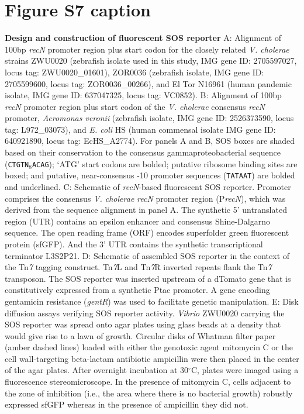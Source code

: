 \documentclass[12pt]{article}
\begin{document}
\section*{Figure S7 caption}
\textbf{Design and construction of fluorescent SOS reporter} A: Alignment of 100bp \textit{recN} promoter region plus start codon for the closely related \textit{V. cholerae} strains ZWU0020 (zebrafish isolate used in this study, IMG gene ID: 2705597027, locus tag: ZWU0020\_01601), ZOR0036 (zebrafish isolate, IMG gene ID: 2705599600, locus tag: ZOR0036\_00266), and El Tor N16961 (human pandemic isolate, IMG gene ID: 637047325, locus tag: VC0852). B: Alignment of 100bp \textit{recN} promoter region plus start codon of the \textit{V. cholerae} consensus \textit{recN} promoter, \textit{Aeromonas veronii} (zebrafish isolate, IMG gene ID: 2526373590, locus tag: L972\_03073), and \textit{E. coli} HS (human commensal isolate IMG gene ID: 640921890, locus tag: EcHS\_A2774). For panels A and B, SOS boxes are shaded based on their conservation to the consensus gammaproteobacterial sequence (\texttt{CTGTN$_8$ACAG}); `ATG' start codons are bolded; putative ribosome binding sites are boxed; and putative, near-consensus -10 promoter sequences (\texttt{TATAAT}) are bolded and underlined. C: Schematic of \textit{recN}-based fluorescent SOS reporter. Promoter comprises the consensus \textit{V. cholerae} \textit{recN} promoter region (P\textit{recN}), which was derived from the sequence alignment in panel A. The synthetic 5' untranslated region (UTR) contains an epsilon enhancer and consensus Shine-Dalgarno sequence. The open reading frame (ORF) encodes superfolder green fluorescent protein (sfGFP). And the 3' UTR contains the synthetic transcriptional terminator L3S2P21. D: Schematic of assembled SOS reporter in the context of the Tn\textit{7} tagging construct. Tn\textit{7}L and Tn\textit{7}R inverted repeats flank the Tn\textit{7} transposon. The SOS reporter was inserted upstream of a dTomato gene that is constitutively expressed from a synthetic Ptac promoter. A gene encoding gentamicin resistance (\textit{gentR}) was used to facilitate genetic manipulation. E: Disk diffusion assays verifying SOS reporter activity. \textit{Vibrio} ZWU0020 carrying the SOS reporter was spread onto agar plates using glass beads at a density that would give rise to a lawn of growth. Circular disks of Whatman filter paper (amber dashed lines) loaded with either the genotoxic agent mitomycin C or the cell wall-targeting beta-lactam antibiotic ampicillin were then placed in the center of the agar plates. After overnight incubation at 30$^{\circ}$C, plates were imaged using a fluorescence stereomicroscope. In the presence of mitomycin C, cells adjacent to the zone of inhibition (i.e., the area where there is no bacterial growth) robustly expressed sfGFP whereas in the presence of ampicillin they did not.    
\end{document}
